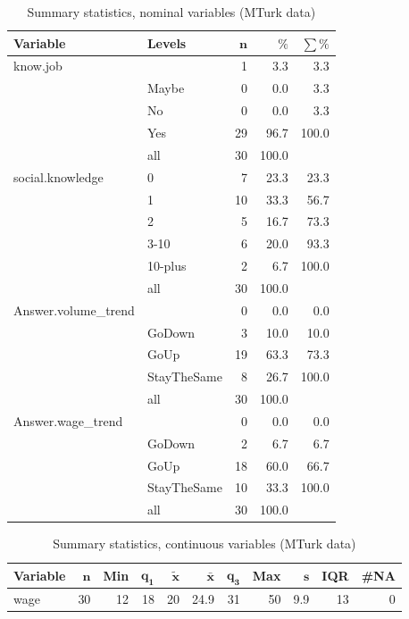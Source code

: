 \documentclass[a4paper,10pt]{article}\usepackage[]{graphicx}\usepackage[]{color}
\begin{document}
\begin{table}[ht]
\centering
{\footnotesize
\begin{tabular}{ll|rrr}
 \textbf{Variable} & \textbf{Levels} & $\mathbf{n}$ & $\mathbf{\%}$ & $\mathbf{\sum \%}$ \\ 
  \hline
know.job &  & 1 & 3.3 & 3.3 \\ 
   & Maybe & 0 & 0.0 & 3.3 \\ 
   & No & 0 & 0.0 & 3.3 \\ 
   & Yes & 29 & 96.7 & 100.0 \\ 
   \hline
 & all & 30 & 100.0 &  \\ 
   \hline
\hline
social.knowledge & 0 & 7 & 23.3 & 23.3 \\ 
   & 1 & 10 & 33.3 & 56.7 \\ 
   & 2 & 5 & 16.7 & 73.3 \\ 
   & 3-10 & 6 & 20.0 & 93.3 \\ 
   & 10-plus & 2 & 6.7 & 100.0 \\ 
   \hline
 & all & 30 & 100.0 &  \\ 
   \hline
\hline
Answer.volume\_trend &  & 0 & 0.0 & 0.0 \\ 
   & GoDown & 3 & 10.0 & 10.0 \\ 
   & GoUp & 19 & 63.3 & 73.3 \\ 
   & StayTheSame & 8 & 26.7 & 100.0 \\ 
   \hline
 & all & 30 & 100.0 &  \\ 
   \hline
\hline
Answer.wage\_trend &  & 0 & 0.0 & 0.0 \\ 
   & GoDown & 2 & 6.7 & 6.7 \\ 
   & GoUp & 18 & 60.0 & 66.7 \\ 
   & StayTheSame & 10 & 33.3 & 100.0 \\ 
   \hline
 & all & 30 & 100.0 &  \\ 
   \hline
\hline
\end{tabular}
}
\caption{Summary statistics, nominal variables (MTurk data)} 
\label{tab1:33-3050}
\end{table}
\begin{table}[ht]
\centering
{\footnotesize
\begin{tabular}{lrrrrrrrrrr}
 \textbf{Variable} & $\mathbf{n}$ & \textbf{Min} & $\mathbf{q_1}$ & $\mathbf{\widetilde{x}}$ & $\mathbf{\bar{x}}$ & $\mathbf{q_3}$ & \textbf{Max} & $\mathbf{s}$ & \textbf{IQR} & \textbf{\#NA} \\ 
  \hline
wage & 30 & 12 & 18 & 20 & 24.9 & 31 & 50 & 9.9 & 13 & 0 \\ 
  \end{tabular}
}
\caption{Summary statistics, continuous variables (MTurk data)} 
\label{tab2:33-3050}
\end{table}
\end{document}
